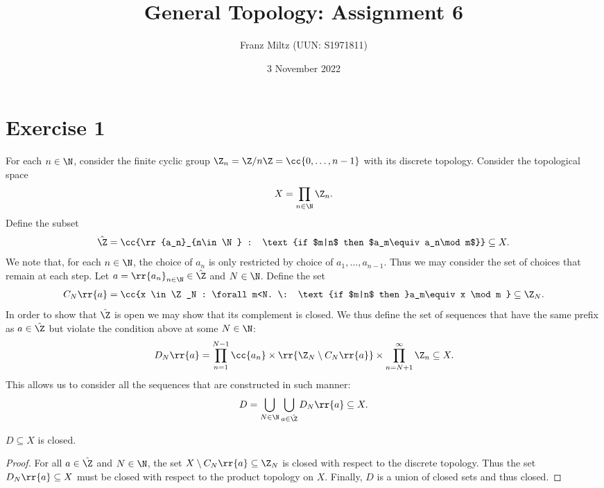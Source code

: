 \documentclass{article}
\begin{document}
\title{General Topology: Assignment 6}
\author{Franz Miltz (UUN: S1971811)}
\date{3 November 2022}
\maketitle

\section*{Exercise 1}

For each $n\in\N$, consider the finite cyclic group $\Z_n=\Z/n\Z=\cc{0,\ldots,n-1}$ with
its discrete topology. Consider the topological space
\begin{align*}
  X=\prod_{n\in\N} \Z_n.
\end{align*}
Define the subset
\begin{align*}
  \hat\Z = \cc{\rr{a_n}_{n\in\N} : \text{if $m|n$ then $a_m\equiv a_n\mod m$}} \subseteq X.
\end{align*}
We note that, for each $n\in\N$, the choice of $a_n$ is only restricted by choice of
$a_1,\ldots,a_{n-1}$. Thus we may consider the set of choices that remain at each step.
Let $a=\rr{a_n}_{n\in\N}\in\hat\Z$ and $N\in\N$. Define the set
\begin{align*}
  C_N\rr{a} = \cc{x \in \Z_N : \forall m<N. \: \text{if $m|n$ then }a_m\equiv x \mod m }\subseteq \Z_N.
\end{align*}
In order to show that $\hat\Z$ is open we may show that its complement is closed. We thus define the
set of sequences that have the same prefix as $a\in\hat\Z$ but violate the condition above
at some $N\in\N$:
\begin{align*}
  D_N\rr{a}=\prod_{n=1}^{N-1}\cc{a_n}\times\rr{\Z_N\setminus C_N\rr{a}}\times \prod_{n=N+1}^{\infty} \Z_n \subseteq X.
\end{align*}
This allows us to consider all the sequences that are constructed in such manner:
\begin{align*}
  D = \bigcup_{N\in\N}\bigcup_{a\in\hat\Z} D_N\rr{a} \subseteq X.
\end{align*}

\begin{claim*}
  $D\subseteq X$ is closed.
  \begin{proof}
    For all $a\in\hat\Z$ and $N\in\N$, the set $X\setminus C_N\rr{a}\subseteq \Z_N$ is closed with
    respect to the discrete topology. Thus the set $D_N\rr{a}\subseteq X$ must be closed
    with respect to the product topology on $X$. Finally, $D$ is a union of closed sets and
    thus closed.
  \end{proof}
\end{claim*}
\end{document}
